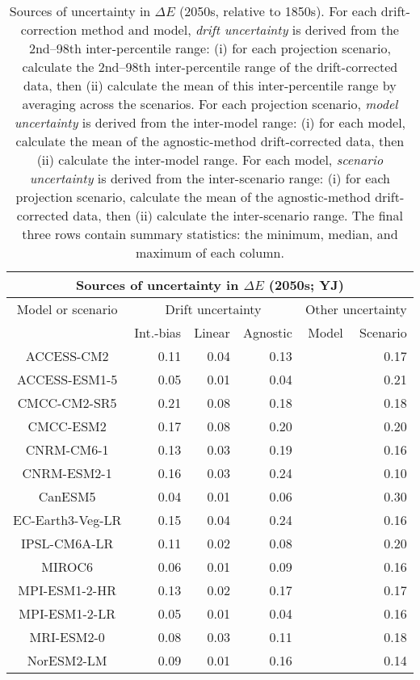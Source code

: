 \begin{table*}[t]
\centering
\caption{Sources of uncertainty in $\Delta E$ (2050s, relative to 1850s). For each drift-correction method and model, \emph{drift uncertainty} is derived from the 2nd--98th inter-percentile range: (i) for each projection scenario, calculate the 2nd--98th inter-percentile range of the drift-corrected data, then (ii) calculate the mean of this inter-percentile range by averaging across the scenarios. For each projection scenario, \emph{model uncertainty} is derived from the inter-model range: (i) for each model, calculate the mean of the agnostic-method drift-corrected data, then (ii) calculate the inter-model range. For each model, \emph{scenario uncertainty} is derived from the inter-scenario range: (i) for each projection scenario, calculate the mean of the agnostic-method drift-corrected data, then (ii) calculate the inter-scenario range. The final three rows contain summary statistics: the minimum, median, and maximum of each column.}
\begin{tabular}{c|rrr|rr}
\toprule
\multicolumn{6}{c}{Sources of uncertainty in $\Delta E$ (2050s; YJ)} \\ 
\midrule
Model or scenario & \multicolumn{3}{c|}{Drift uncertainty} & \multicolumn{2}{c}{Other uncertainty} \\
 & Int.-bias & Linear & Agnostic & Model & Scenario \\
\midrule
ACCESS-CM2 & 0.11 & 0.04 & 0.13 &  & 0.17 \\
ACCESS-ESM1-5 & 0.05 & 0.01 & 0.04 &  & 0.21 \\
CMCC-CM2-SR5 & 0.21 & 0.08 & 0.18 &  & 0.18 \\
CMCC-ESM2 & 0.17 & 0.08 & 0.20 &  & 0.20 \\
CNRM-CM6-1 & 0.13 & 0.03 & 0.19 &  & 0.16 \\
CNRM-ESM2-1 & 0.16 & 0.03 & 0.24 &  & 0.10 \\
CanESM5 & 0.04 & 0.01 & 0.06 &  & 0.30 \\
EC-Earth3-Veg-LR & 0.15 & 0.04 & 0.24 &  & 0.16 \\
IPSL-CM6A-LR & 0.11 & 0.02 & 0.08 &  & 0.20 \\
MIROC6 & 0.06 & 0.01 & 0.09 &  & 0.16 \\
MPI-ESM1-2-HR & 0.13 & 0.02 & 0.17 &  & 0.17 \\
MPI-ESM1-2-LR & 0.05 & 0.01 & 0.04 &  & 0.16 \\
MRI-ESM2-0 & 0.08 & 0.03 & 0.11 &  & 0.18 \\
NorESM2-LM & 0.09 & 0.01 & 0.16 &  & 0.14 \\

\end{tabular}
\end{table*}
